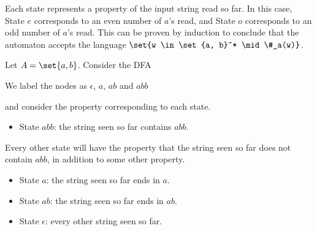Each state represents a property of the input string read so far.
In this case, State $e$ corresponds to an even number of $a$'s read,
and State $o$ corresponds to an odd number of $a$'s read.
This can be proven by induction to conclude that the automaton accepts the
language $\set{w \in \set{a, b}^* \mid \#_a(w)}$.

\begin{example}
    Let $A = \set{a, b}$.
    Consider the DFA
    \begin{center}
    \end{center}
    We label the nodes as $\epsilon$, $a$, $ab$ and $abb$
    \begin{center}
    \end{center}
    and consider the property corresponding to each state.
    \begin{itemize}
        \item State $abb$: the string seen so far contains $abb$.
    \end{itemize}
    Every other state will have the property that the string seen so far
    does not contain $abb$, in addition to some other property.
    \begin{itemize}
        \item State $a$: the string seen so far ends in $a$.
        \item State $ab$: the string seen so far ends in $ab$.
        \item State $\epsilon$: every other string seen so far.
    \end{itemize}
\end{example}

